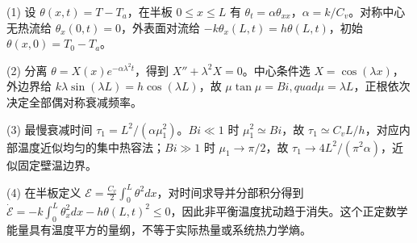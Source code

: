 (1) 设 \(\theta(x,t)=T-T_a\)，在半板 \(0\le x\le L\) 有 \(\theta_t=\alpha\theta_{xx}\)，\(\alpha=k/C_v\)。对称中心无热流给 \(\theta_x(0,t)=0\)，外表面对流给 \(-k\theta_x(L,t)=h\theta(L,t)\)，初始 \(\theta(x,0)=T_0-T_a\)。

(2) 分离 \(\theta=X(x)e^{-\alpha\lambda^2t}\)，得到 \(X''+\lambda^2X=0\)。中心条件选 \(X=\cos(\lambda x)\)，外边界给 \(k\lambda\sin(\lambda L)=h\cos(\lambda L)\)，故 \(\boxed{\mu\tan\mu=Bi,quad\mu=\lambda L}\)，正根依次决定全部偶对称衰减频率。

(3) 最慢衰减时间 \(\tau_1=L^2/(\alpha\mu_1^2)\)。\(Bi\ll1\) 时 \(\mu_1^2\simeq Bi\)，故 \(\tau_1\simeq C_vL/h\)，对应内部温度近似均匀的集中热容法；\(Bi\gg1\) 时 \(\mu_1\to\pi/2\)，故 \(\tau_1\to4L^2/(\pi^2\alpha)\)，近似固定壁温边界。

(4) 在半板定义 \(\mathcal E=\frac{C_v}{2}\int_0^L\theta^2dx\)，对时间求导并分部积分得到 \(\dot{\mathcal E}=-k\int_0^L\theta_x^2dx-h\theta(L,t)^2\le0\)，因此非平衡温度扰动趋于消失。这个正定数学能量具有温度平方的量纲，不等于实际热量或系统热力学熵。
